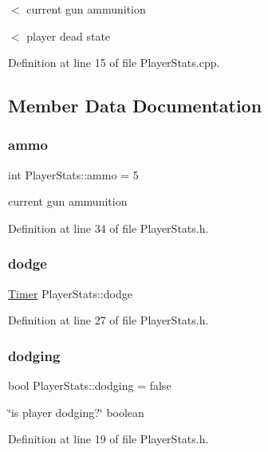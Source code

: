 $<$ current gun ammunition

$<$ player dead state 

Definition at line 15 of file Player\+Stats.\+cpp.



\subsection{Member Data Documentation}
\mbox{\label{struct_player_stats_a2600a3f6f284a3eeddcc080953e90dfa}} 
\subsubsection{\texorpdfstring{ammo}{ammo}}
{\footnotesize\ttfamily int Player\+Stats\+::ammo = 5}

current gun ammunition 

Definition at line 34 of file Player\+Stats.\+h.

\mbox{\label{struct_player_stats_a55071f370b68104e5ee0c3d56ee6e9a4}} 
\subsubsection{\texorpdfstring{dodge}{dodge}}
{\footnotesize\ttfamily \hyperlink{struct_timer}{Timer} Player\+Stats\+::dodge}



Definition at line 27 of file Player\+Stats.\+h.

\mbox{\label{struct_player_stats_a407c02f77b9057c2dc2405fda01ffc10}} 
\subsubsection{\texorpdfstring{dodging}{dodging}}
{\footnotesize\ttfamily bool Player\+Stats\+::dodging = false}

\char`\"{}is player dodging?\char`\"{} boolean 

Definition at line 19 of file Player\+Stats.\+h.

\mbox{\label{struct_player_stats_ae27c978afce4840051663616408251ea}} 
